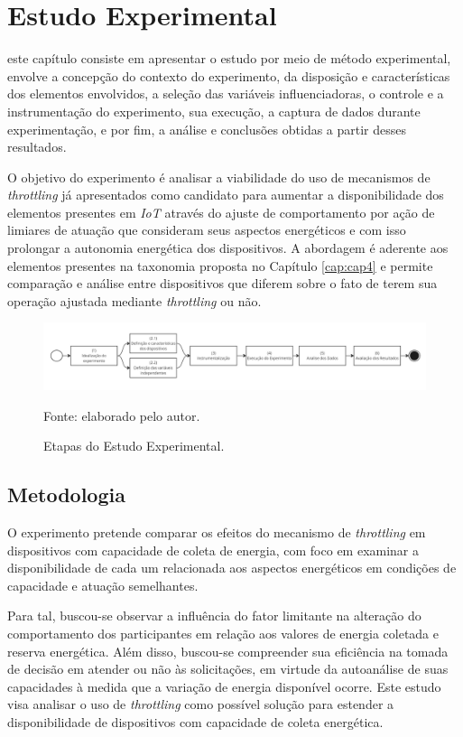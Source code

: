 \chapter{Estudo Experimental}
\label{cap:cap6}

este capítulo consiste em apresentar o estudo por meio de método experimental, envolve a concepção do contexto do experimento, da disposição e características dos elementos envolvidos, a seleção das variáveis influenciadoras, o controle e a instrumentação do experimento, sua execução, a captura de dados durante experimentação, e por fim, a análise e conclusões obtidas a partir desses resultados. 

O objetivo do experimento é analisar a viabilidade do uso de mecanismos de \textit{throttling} já apresentados como candidato para aumentar a disponibilidade dos elementos presentes em \textit{IoT} através do ajuste de comportamento por ação de limiares de atuação que consideram seus aspectos energéticos e com isso prolongar a autonomia energética dos dispositivos. A abordagem é aderente aos elementos presentes na taxonomia proposta no Capítulo \ref{cap:cap4} e permite comparação e análise entre dispositivos que diferem sobre o fato de terem sua operação ajustada mediante \textit{throttling} ou não. 

\begin{figure}[H]
	\centering
	\caption{Etapas do Estudo Experimental.}
	\label{fig:cap6metodologia}
	\includegraphics[width=1\linewidth]{Imagens/cap6/cap6metodologia.jpg}
	
	Fonte: elaborado pelo autor.
\end{figure} 


\section{Metodologia}

O experimento pretende comparar os efeitos do mecanismo de \textit{throttling} em dispositivos com capacidade de coleta de energia, com foco em examinar a disponibilidade de cada um relacionada aos aspectos energéticos em condições de capacidade e atuação semelhantes.

Para tal, buscou-se observar a influência do fator limitante na alteração do comportamento dos participantes em relação aos valores de energia coletada e reserva energética. Além disso, buscou-se compreender sua eficiência na tomada de decisão em atender ou não às solicitações, em virtude da autoanálise de suas capacidades à medida que a variação de energia disponível ocorre. Este estudo visa analisar o uso de \textit{throttling} como possível solução para estender a disponibilidade de dispositivos com capacidade de coleta energética. 

